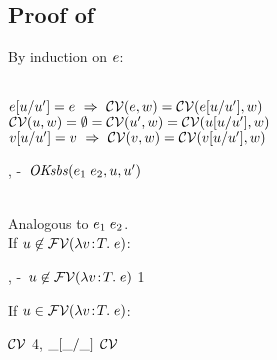 \subsection*{Proof of }

By induction on $e$:
\begin{bycase}
\Case{$\opO$, $\descopO$, $\pjop{\fnam}$}\\
$e[u/u']=e\ \Rightarrow\ 
 \mathcal{CV}(e,w)=\mathcal{CV}(e[u/u'],w)$
\Case{$\varI$}\\
$\mathcal{CV}(u,w)=
 \emptyset=
 \mathcal{CV}(u',w)=
 \mathcal{CV}(u[u/u'],w)$
\Case{$\var\neq\varI$}\\
$v[u/u']=v\ \Rightarrow\ 
 \mathcal{CV}(v,w)=\mathcal{CV}(v[u/u'],w)$
\Case{$\appO$}
\begin{derivation}
     {, \hyp\ $\mathit{OKsbs}(e_1\;e_2,u,u')$}
\steP
{\cvarv{\appO}{\varII}
 \linK{=}
 \cup{}
 \cup
 \linK{=}
 \linK{=}
 \cvarv{\esbsren{(\appO)}}{\varII}}
\end{derivation}
\Case{$\eqO$, $\iifO$}\\
Analogous to $\appO$.
\Case{$\absO$}\\
If $u\not\in\mathcal{FV}(\lambda v\!:\!T.\;e)$:
\begin{derivation}
\step{\esbsren{(\absO)}=\absO}
     {, \hyp\ $u\not\in\mathcal{FV}(\lambda v\!:\!T.\;e)$}
\step{\cvarv{\absO}{\varII}=\cvarv{\esbsren{(\absO)}}{\varII}}
     {1}
\end{derivation}
\noindent
If $u\in\mathcal{FV}(\lambda v\!:\!T.\;e)$:
\begin{derivation}
\step{\cvarv{\absO}{\varII}=
      \cond{\varII\in\efvar{\expr}-\setI{\var}}
           {\setI{\var}\cup\cvarv{\expr}{\varII}}
           {\emptyset}}
     {$\mathcal{CV}$}
\step{\varI\in\efvar{\absO}}{\hyp}
\step{\cvarv{\esbsren{(\absO)}}{\varII}=
      \cvarv{\abs{\var}{\typ}{\esbsren{\expr}}}{\varII}}
     {4, $\_[\_/\_]$}
\step{\cvarv{\abs{\var}{\typ}{\esbsren{\expr}}}{\varII}=
      \cond{\varII\in\efvar{\esbsren{\expr}}-\setI{\var}}
           {\setI{\var}\cup\cvarv{\esbsren{\expr}}{\varII}}
           {\emptyset}}
     {$\mathcal{CV}$}

\end{derivation}
\end{bycase}
